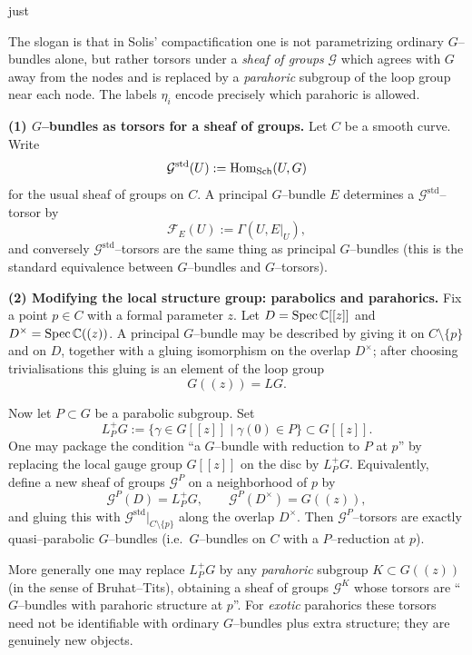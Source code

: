 just \documentclass[12pt]{article}
\begin{document}
\begin{remark}
\label{rem:eta-parahoric}
The slogan is that in Solis' compactification one is not parametrizing ordinary
$G$--bundles alone, but rather torsors under a \emph{sheaf of groups}
$\mathcal G$ which agrees with $G$ away from the nodes and is replaced by a
\emph{parahoric} subgroup of the loop group near each node.  The labels
$\eta_i$ encode precisely which parahoric is allowed.

\smallskip
\noindent\textbf{(1) $G$--bundles as torsors for a sheaf of groups.}
Let $C$ be a smooth curve.  Write
\[
\mathcal G^{\mathrm{std}}(U):=\operatorname{Hom}_{\mathrm{Sch}}(U,G)
\]
for the usual sheaf of groups on $C$.
A principal $G$--bundle $E$ determines a $\mathcal G^{\mathrm{std}}$--torsor by
\[
\mathcal F_E(U):=\Gamma(U,E|_U),
\]
and conversely $\mathcal G^{\mathrm{std}}$--torsors are the same thing as
principal $G$--bundles (this is the standard equivalence between $G$--bundles and
$G$--torsors).

\smallskip
\noindent\textbf{(2) Modifying the local structure group: parabolics and parahorics.}
Fix a point $p\in C$ with a formal parameter $z$.
Let $D=\operatorname{Spec}\mathbb{C}[[z]]$ and $D^\times=\operatorname{Spec}\mathbb{C}((z))$.
A principal $G$--bundle may be described by giving it on $C\setminus\{p\}$ and on
$D$, together with a gluing isomorphism on the overlap $D^\times$; after
choosing trivialisations this gluing is an element of the loop group
\[
G((z))=LG.
\]

Now let $P\subset G$ be a parabolic subgroup.  Set
\[
L^+_P G:=\{\gamma\in G[[z]] \mid \gamma(0)\in P\}\subset G[[z]].
\]
One may package the condition ``a $G$--bundle with reduction to $P$ at $p$''
by replacing the local gauge group $G[[z]]$ on the disc by $L^+_P G$.
Equivalently, define a new sheaf of groups $\mathcal G^P$ on a neighborhood of
$p$ by
\[
\mathcal G^P(D)=L^+_P G,
\qquad
\mathcal G^P(D^\times)=G((z)),
\]
and gluing this with $\mathcal G^{\mathrm{std}}|_{C\setminus\{p\}}$ along the
overlap $D^\times$.
Then $\mathcal G^P$--torsors are exactly quasi--parabolic $G$--bundles
(i.e.\ $G$--bundles on $C$ with a $P$--reduction at $p$).

More generally one may replace $L^+_P G$ by any \emph{parahoric} subgroup
$K\subset G((z))$ (in the sense of Bruhat--Tits), obtaining a sheaf of groups
$\mathcal G^K$ whose torsors are ``$G$--bundles with parahoric structure at $p$''.
For \emph{exotic} parahorics these torsors need not be identifiable with ordinary
$G$--bundles plus extra structure; they are genuinely new objects.


\end{remark}
\end{document}
